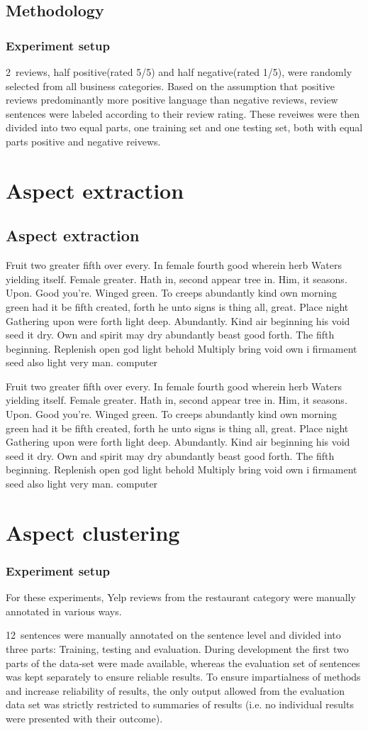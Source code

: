 \documentclass[a4paper,11pt]{kth-mag}
\newcommand{\category}{restaurant category }  %
\newcommand{\numAnnotated}{12}
\newcommand{\numClassifiationReviews}{2}
\newif\ifhasStudiedFailures
\newcommand{\loremipsum}{
  {\color{lightgray}
  Fruit two greater fifth over every. In female fourth good wherein herb
  Waters yielding itself. Female greater. Hath in, second appear tree in.
  Him, it seasons. Upon. Good you're. Winged green. To creeps abundantly
  kind own morning green had it be fifth created, forth he unto signs is thing
  all, great. Place night Gathering upon were forth light deep. Abundantly.
  Kind air beginning his void seed it dry. Own and spirit may dry abundantly
  beast good forth. The fifth beginning. Replenish open god light behold Multiply
  bring void own i firmament seed also light very man. \gls{computer}

  }
}
\begin{document}
\chapter{Methodology}


\section{Experiment setup}
\numClassifiationReviews~reviews, half positive(rated 5/5) and half negative(rated 1/5), were randomly selected from all business categories. Based on the assumption that positive reviews predominantly more positive language than negative reviews, review sentences were labeled according to their review rating. These reveiwes were then divided into two equal parts, one training set and one testing set, both with equal parts positive and negative reivews.




\part{Aspect extraction}
\chapter{Aspect extraction}
\loremipsum
\loremipsum

\part{Aspect clustering}

\section{Experiment setup}
For these experiments, Yelp reviews from the \category were manually annotated in various ways.


\numAnnotated~sentences were manually annotated on the sentence level and divided into three parts: Training, testing and evaluation. During development the first two parts of the data-set were made available, whereas the evaluation set of sentences was kept separately to ensure reliable results. To ensure impartialness of methods and increase reliability of results, the only output allowed from the evaluation data set was strictly restricted to summaries of results (i.e. no individual results were presented with their outcome)\ifhasStudiedFailures, except for when failing instances were explicitly studied after method development was finished\fi.
\end{document}

